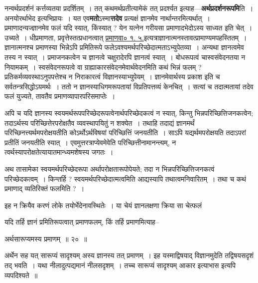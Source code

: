 \documentclass[article,12pt,a4paper]{memoir}
\begin{document}
	  \pstart नन्वर्थप्रदर्शनं कर्त्तव्यतया प्रदर्शितम् । तत् कथमर्थप्रतीत्यामेकं तत् प्रदर्श्यत इत्याह—\textbf{अर्थप्रदर्शनरूपमि}ति । अनयोरर्थाभेद इत्यभिप्रायः । यत एव\textbf{मतो}ऽस्मा\textbf{त्तदेव} प्रत्यक्षं ज्ञानमेव नार्थान्तरमित्यर्थात् । प्रमाणादन्यज्ज्ञानमेव फलं यदि स्यात्, किंस्यात् ? येन यत्नेन गरीयसा प्रमाणादभेदोऽस्य साध्यत इति चेत् । उच्यते । धीप्रमाणता, प्रवृत्तेस्तत्प्रधानत्वात् \href{http://sarit.indology.info/?cref=pv.1.5}{प्रमाणवा०
	१. ५.}इत्यत्राज्ञानात्मनस्तावत्प्रामाण्यमपहस्तितम् । ज्ञानात्मनश्च प्रमाणस्या भिन्नेऽपि प्रमितिरूपे फलेऽवश्यमर्थपरिच्छेदात्मताऽभ्युपेतव्या । अन्यथा ज्ञानत्वमेव तस्य न स्यात् । प्रमाजनकत्वेन च ज्ञानत्वे चक्षुरादेरपि ज्ञानत्वं स्यात् । बोधरूपत्वं चास्वसंवेदनतया न नियामकम् । स्वसंवेदनरूपत्वे वा ग्राह्याकारसंवेदनमेवार्थवेदनमिति कथं भिन्नं फलम् ? प्रतिकर्मव्यवस्थाऽनुपपत्तेश्च न निराकारत्वं विज्ञानस्याभ्युपेयम् । ज्ञानमेवार्थस्य प्रकाश इति च सर्वतन्त्रसिद्धोऽयमर्थः । ततो न ज्ञानस्याधिगमरूपतायां विप्रतिपत्तव्यं केनचित् । सत्यां च तदात्मतायां तदेव फलं युज्यते, तावतैव प्रमाणव्यापारपरिसमाप्तेः ।
	\pend
      

	  \pstart अपि च यदि ज्ञानस्य स्वयमर्थरूपपरिच्छेदरूपत्वेनार्थपरिच्छेदकत्वं न स्यात्, किन्तु भिन्नपरिच्छित्तिजनकत्वेन; तदाऽर्थस्य परिच्छित्तेरपरोक्षतैव व्यवस्थापयितुं न शक्येत । तथाहि तदाद्यं ज्ञानमर्थं परिच्छिनत्त्यर्थमपरोक्षयतीति कोऽर्थोऽर्थविषयां परिच्छित्तिं जनयतीति । साऽपि यद्यर्थमपरोक्षयति तदाऽपरां प्रतीतिं जनयतीति स्यात् । एवमुत्तरत्राप्येवमेवेति परिच्छित्तीनामानन्त्यम्, न त्वर्थस्यापरोक्षतेत्यायातमान्ध्यमशेषस्य जगतः ।
	\pend
      

	  \pstart अथ तासामेका स्वयमर्थपरिच्छेदरूपा अर्थापरोक्षतारूपोपेयते; तदा न भिन्नपरिच्छित्तिजनकत्वं परिच्छेदकत्वम् । किन्तर्हि ? स्वयमर्थपरिच्छेदात्मत्वमिति आद्यस्यापि तथात्वमनिवारितम् । तथा च कथं प्रमाणाद् व्यतिरिक्तं फलमिति ? ।
	\pend
      

	  \pstart इह न क्रियैव करणं लोके तयोर्भेदेनावस्थितेः । या चेयं ज्ञानलक्षणा क्रिया सा चेत्फलं
	\pend
	  \bigskip
	  \begingroup
	

	  \pstart यदि तर्हि ज्ञानं प्रमितिरूपत्वात् प्रमाणफलम्, किं तर्हि प्रमाणमित्याह--
	\pend
        
	  \bigskip
	  \begingroup
	

	  \pstart अर्थसारूप्यमस्य प्रमाणम् ॥ २० ॥
	\pend
      
	  \endgroup
	 

	  \pstart अर्थेन सह यत् सारूप्यं सादृश्यम् अस्य ज्ञानस्य तत् प्रमाणम् । इह यस्माद्विषयाद् विज्ञानमुदेति तद्विषयसदृशं तद् भवति । यथा नीलादुत्पद्यमानं नीलसदृशम् । तच्च सारूप्यं सादृश्यम् आकार इत्याभास इत्यपि व्यपदिश्यते ॥
	\pend
        
\end{document}
